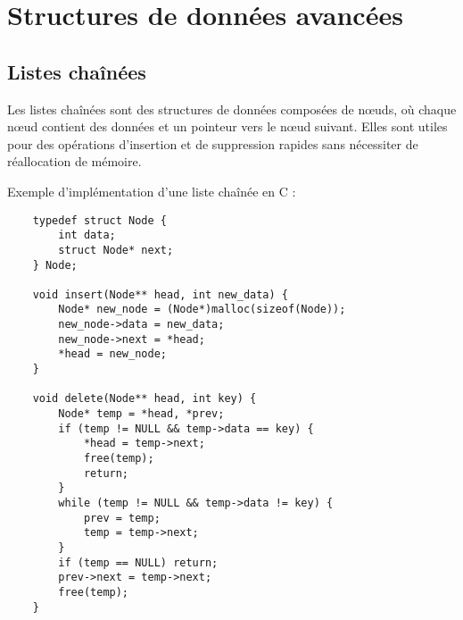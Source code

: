 %


\chapter{Structures de données avancées}

\section{Listes chaînées}
Les listes chaînées sont des structures de données composées de nœuds, où chaque nœud contient des données et un pointeur vers le nœud suivant. Elles sont utiles pour des opérations d'insertion et de suppression rapides sans nécessiter de réallocation de mémoire.

Exemple d'implémentation d'une liste chaînée en C :

\begin{lstlisting}
	typedef struct Node {
		int data;
		struct Node* next;
	} Node;
	
	void insert(Node** head, int new_data) {
		Node* new_node = (Node*)malloc(sizeof(Node));
		new_node->data = new_data;
		new_node->next = *head;
		*head = new_node;
	}
	
	void delete(Node** head, int key) {
		Node* temp = *head, *prev;
		if (temp != NULL && temp->data == key) {
			*head = temp->next;
			free(temp);
			return;
		}
		while (temp != NULL && temp->data != key) {
			prev = temp;
			temp = temp->next;
		}
		if (temp == NULL) return;
		prev->next = temp->next;
		free(temp);
	}
\end{lstlisting}

